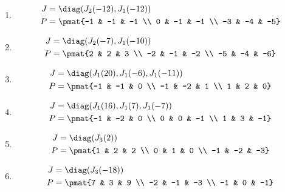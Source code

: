 \begin{enumerate}
\item

\begin{align*}
J &= \diag(J_{2}(-12), J_{1}(-12))\\
P &= \pmat{-1 & -1 & -1 \\ 0 & -1 & -1 \\ -3 & -4 & -5}
\end{align*}

\item

\begin{align*}
J &= \diag(J_{2}(-7), J_{1}(-10))\\
P &= \pmat{2 & 2 & 3 \\ -2 & -1 & -2 \\ -5 & -4 & -6}
\end{align*}

\item

\begin{align*}
J &= \diag(J_{1}(20), J_{1}(-6), J_{1}(-11))\\
P &= \pmat{-1 & -1 & 0 \\ -1 & -2 & 1 \\ 1 & 2 & 0}
\end{align*}

\item

\begin{align*}
J &= \diag(J_{1}(16), J_{1}(7), J_{1}(-7))\\
P &= \pmat{-1 & -2 & 0 \\ 0 & 0 & -1 \\ 1 & 3 & -1}
\end{align*}

\item

\begin{align*}
J &= \diag(J_{3}(2))\\
P &= \pmat{1 & 2 & 2 \\ 0 & 1 & 0 \\ -1 & -2 & -3}
\end{align*}

\item

\begin{align*}
J &= \diag(J_{3}(-18))\\
P &= \pmat{7 & 3 & 9 \\ -2 & -1 & -3 \\ -1 & 0 & -1}
\end{align*}


\end{enumerate}
